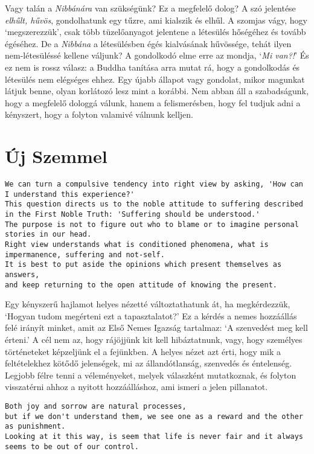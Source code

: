 Vagy talán a \emph{Nibbánára} van szükségünk? Ez a megfelelő dolog? A
szó jelentése \emph{elhűlt, hűvös}, gondolhatunk egy tűzre, ami kialszik
és elhűl. A szomjas vágy, hogy `megszerezzük', csak több tüzelőanyagot
jelentene a létesülés hőségéhez és tovább égéséhez. De a \emph{Nibbána}
a létesülésben égés kialvásának hűvössége, tehát ilyen nem-létesüléssé
kellene váljunk? A gondolkodó elme erre az mondja, `\emph{Mi van?!}' És
ez nem is rossz válasz: a Buddha tanítása arra mutat rá, hogy a
gondolkodás és létesülés nem elégséges ehhez. Egy újabb állapot vagy
gondolat, mikor magunkat látjuk benne, olyan korlátozó lesz mint a
korábbi. Nem abban áll a szabadságunk, hogy a megfelelő dologgá válunk,
hanem a felismerésben, hogy fel tudjuk adni a kényszert, hogy a folyton
valamivé válnunk kelljen.

\section{Új Szemmel}

\begin{verbatim}
We can turn a compulsive tendency into right view by asking, 'How can I understand this experience?'
This question directs us to the noble attitude to suffering described in the First Noble Truth: 'Suffering should be understood.'
The purpose is not to figure out who to blame or to imagine personal stories in our head.
Right view understands what is conditioned phenomena, what is impermanence, suffering and not-self.
It is best to put aside the opinions which present themselves as answers,
and keep returning to the open attitude of knowing the present.
\end{verbatim}

Egy kényszerű hajlamot helyes nézetté változtathatunk át, ha
megkérdezzük, `Hogyan tudom megérteni ezt a tapasztalatot?' Ez a kérdés
a nemes hozzáállás felé irányít minket, amit az Első Nemes Igazság
tartalmaz: `A szenvedést meg kell érteni.' A cél nem az, hogy rájöjjünk
kit kell hibáztatnunk, vagy, hogy személyes történeteket képzeljünk el a
fejünkben. A helyes nézet azt érti, hogy mik a feltételekhez kötődő
jelenségek, mi az állandótlanság, szenvedés és éntelenség. Legjobb félre
tenni a véleményeket, melyek válaszként mutatkoznak, és folyton
visszatérni ahhoz a nyitott hozzáálláshoz, ami ismeri a jelen
pillanatot.

\begin{verbatim}
Both joy and sorrow are natural processes,
but if we don't understand them, we see one as a reward and the other as punishment.
Looking at it this way, is seem that life is never fair and it always seems to be out of our control.
\end{verbatim}

